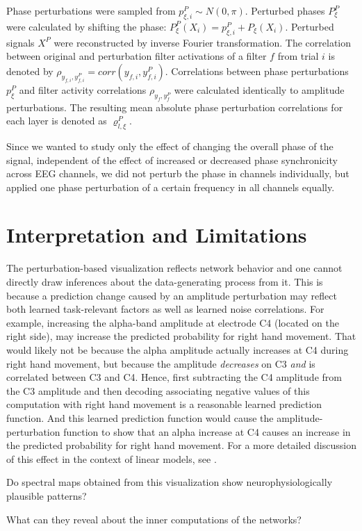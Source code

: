 Phase perturbations were sampled from $p^{P}_{\xi,i}{\sim}N(0,\pi)$.
Perturbed phases $P^{P}_\xi$ were calculated by shifting the phase:
$P^{P}_\xi(X_i)=p^{P}_{\xi,i}+P_\xi(X_i)$. Perturbed signals $X^{P}$
were reconstructed by inverse Fourier transformation. The correlation
between original and perturbation filter activations of a filter $f$
from trial $i$ is denoted by
$\rho_{y_{f,i},y^{P}_{f,i}}=corr(y_{f,i},y^{P}_{f,i})$. Correlations
between phase perturbations $p^{P}_{\xi}$ and filter activity
correlations $\rho_{y_{f},y^{P}_{f}}$ were calculated identically to
amplitude perturbations. The resulting mean absolute phase perturbation
correlations for each layer is denoted as $\varrho^P_{l,\xi}$.

Since we wanted to study only the effect of changing the overall phase
of the signal, independent of the effect of increased or decreased phase
synchronicity across EEG channels, we did not perturb the phase in
channels individually, but applied one phase perturbation of a certain
frequency in all channels equally.

\section{Interpretation and Limitations}
\label{perturbation-visualization-interpretation}


    The perturbation-based visualization reflects network behavior and one
cannot directly draw inferences about the data-generating process from
it. This is because a prediction change caused by an amplitude
perturbation may reflect both learned task-relevant factors as well as
learned noise correlations. For example, increasing the alpha-band
amplitude at electrode C4 (located on the right side), may increase the
predicted probability for right hand movement. That would likely not be
because the alpha amplitude actually increases at C4 during right hand
movement, but because the amplitude \emph{decreases} on C3 \emph{and} is
correlated between C3 and C4. Hence, first subtracting the C4 amplitude
from the C3 amplitude and then decoding associating negative values of
this computation with right hand movement is a reasonable learned
prediction function. And this learned prediction function would cause
the amplitude-perturbation function to show that an alpha increase at C4
causes an increase in the predicted probability for right hand movement.
For a more detailed discussion of this effect in the context of linear
models, see \citep{haufe_interpretation_2014}.

\begin{openbox}
\item Do spectral maps obtained from this visualization show neurophysiologically plausible patterns?
\item What can they reveal about the inner computations of the networks?
\end{openbox}

    

